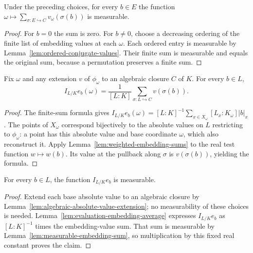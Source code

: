 \begin{lemma}
\label{lem:measurable-embedding-sum}
\leanok
{}
Under the preceding choices, for every $b\in E$ the function
$\omega\mapsto\sum_{\sigma:E\hookrightarrow C}v_\omega(\sigma(b))$
is measurable.
\end{lemma}
\begin{proof}
For $b=0$ the sum is zero. For $b\ne0$, choose a decreasing ordering
of the finite list of embedding values at each $\omega$.
Each ordered entry is measurable by Lemma~\ref{lem:ordered-conjugate-values}.
Their finite sum is measurable and equals the original sum, because a
permutation preserves a finite sum.
\end{proof}

\begin{lemma}
\label{lem:evaluation-embedding-average}
\leanok
{}
Fix $\omega$ and any extension $v$ of $\phi_\omega$ to an algebraic
closure $C$ of $K$. For every $b\in L$,
\[
 I_{L/K}e_b(\omega)=\frac1{[L:K]}
   \sum_{\sigma:L\hookrightarrow C}v(\sigma(b)).
\]
\end{lemma}
\begin{proof}
The finite-sum formula gives
$I_{L/K}e_b(\omega)=[L:K]^{-1}\sum_{x\in X_\omega}
[L_x:K_\omega]|b|_x$. The points of $X_\omega$ correspond bijectively
to the absolute values on $L$ restricting to $\phi_\omega$: a point
has this absolute value and base coordinate $\omega$, which also
reconstruct it. Apply Lemma~\ref{lem:weighted-embedding-sums} to the
real test function $w\mapsto w(b)$. Its value at the pullback along
$\sigma$ is $v(\sigma(b))$, yielding the formula.
\end{proof}

\begin{lemma}\label{lem:measurable-evaluation-average}
\leanok
{}
For every $b\in L$, the function $I_{L/K}e_b$ is measurable.
\end{lemma}
\begin{proof}
Extend each base absolute value to an algebraic closure by
Lemma~\ref{lem:algebraic-absolute-value-extension}; no measurability
of these choices is needed. Lemma~\ref{lem:evaluation-embedding-average}
expresses $I_{L/K}e_b$ as $[L:K]^{-1}$ times the embedding-value sum.
That sum is measurable by Lemma~\ref{lem:measurable-embedding-sum},
so multiplication by this fixed real constant proves the claim.
\end{proof}

